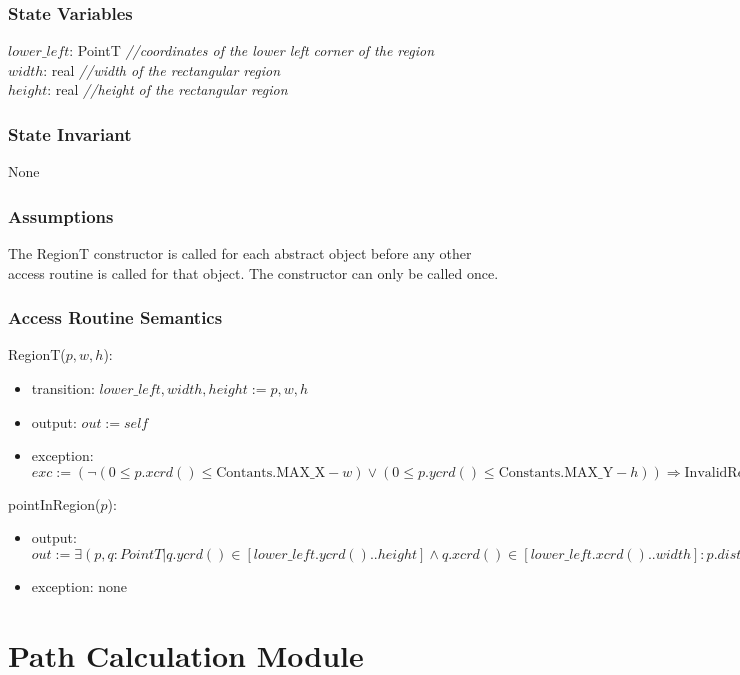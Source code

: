 \documentclass[12pt]{article}
\begin{document}
\subsubsection* {State Variables}

$\mathit{lower\_left}$: PointT {\it //coordinates of the lower left corner of the region}\\
$\mathit{width}$: real {\it //width of the rectangular region}\\
$\mathit{height}$: real {\it //height of the rectangular region}

\subsubsection* {State Invariant}
None

\subsubsection* {Assumptions}
The RegionT constructor is called for each abstract object before any other access routine is called for that
object.  The constructor can only be called once.

\subsubsection* {Access Routine Semantics}

\noindent RegionT($p, w, h$):
\begin{itemize}
\item transition: $\mathit{lower\_left}, \mathit{width}, \mathit{height} := p, w, h$
\item output: $out := \mathit{self}$
\item exception: $exc := (\lnot (0 \leq p.xcrd() \leq \mbox{Contants.MAX\_X} - w) \vee (0 \leq p.ycrd() \leq \mbox{Constants.MAX\_Y} - h)) \Rightarrow
\mbox{InvalidRegionException})$
\end{itemize}

\noindent pointInRegion($p$):
\begin{itemize}
\item output: $\mathit{out} :=  \exists (p, q : PointT| q.ycrd() \in [lower\_left.ycrd() .. height] \land q.xcrd() \in [lower\_left.xcrd() .. width] : p.dist(q) < TOLERANCE) $
\item exception: none
\end{itemize}

\newpage

\section* {Path Calculation Module}
\end{document}
